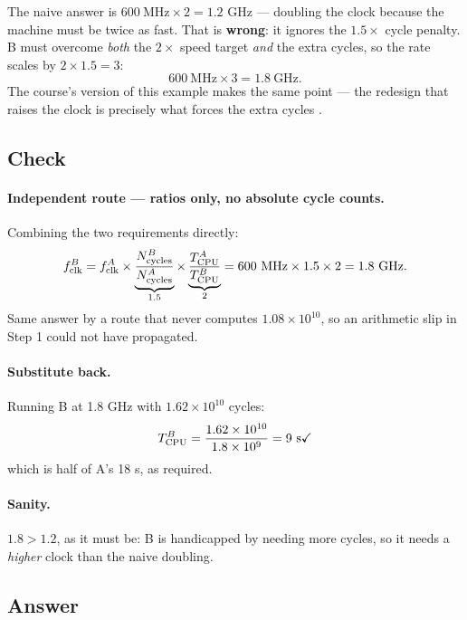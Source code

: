 \begin{trap}
The naive answer is $600\ \text{MHz} \times 2 = 1.2$ GHz --- doubling the clock
because the machine must be twice as fast. That is \textbf{wrong}: it ignores
the $1.5\times$ cycle penalty. B must overcome \emph{both} the $2\times$ speed
target \emph{and} the extra cycles, so the rate scales by $2 \times 1.5 = 3$:
$$600\ \text{MHz} \times 3 = 1.8\ \text{GHz.}$$
The course's version of this example makes the same point --- the redesign that
raises the clock is precisely what forces the extra cycles .
\end{trap}

\subsection*{Check}

\paragraph{Independent route --- ratios only, no absolute cycle counts.}
Combining the two requirements directly:
\begin{equation}
  f_{\mathrm{clk}}^{B}
    = f_{\mathrm{clk}}^{A} \times \underbrace{\frac{N_{\mathrm{cycles}}^{B}}{N_{\mathrm{cycles}}^{A}}}_{1.5}
                     \times \underbrace{\frac{T_{\mathrm{CPU}}^{A}}{T_{\mathrm{CPU}}^{B}}}_{2}
    = 600\ \text{MHz} \times 1.5 \times 2 = 1.8\ \text{GHz.}
\end{equation}
Same answer by a route that never computes $1.08\times10^{10}$, so an arithmetic
slip in Step 1 could not have propagated.

\paragraph{Substitute back.}
Running B at 1.8 GHz with $1.62\times10^{10}$ cycles:
\begin{equation}
  T_{\mathrm{CPU}}^{B} = \frac{1.62\times10^{10}}{1.8\times10^{9}} = 9\ \text{s} \checkmark
\end{equation}
which is half of A's 18 s, as required.

\paragraph{Sanity.} $1.8 > 1.2$, as it must be: B is handicapped by needing more
cycles, so it needs a \emph{higher} clock than the naive doubling.

\subsection*{Answer}

